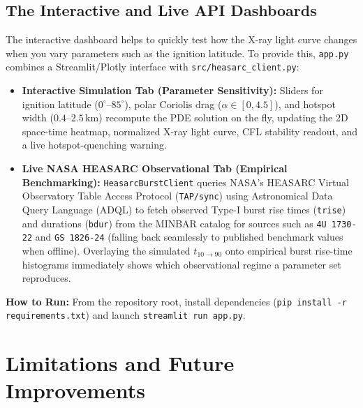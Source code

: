 \documentclass[11pt,a4paper]{article}
\begin{document}
\subsection{The Interactive and Live API Dashboards}
The interactive dashboard helps to quickly test how the X-ray light curve changes when you vary parameters such as the ignition latitude. To provide this, \texttt{app.py} combines a Streamlit/Plotly interface with \texttt{src/heasarc\_client.py}:
\begin{itemize}
    \item \textbf{Interactive Simulation Tab (Parameter Sensitivity):} Sliders for ignition latitude ($0^\circ$--$85^\circ$), polar Coriolis drag ($\alpha \in [0, 4.5]$), and hotspot width ($0.4$--$2.5\,\mathrm{km}$) recompute the PDE solution on the fly, updating the 2D space-time heatmap, normalized X-ray light curve, CFL stability readout, and a live hotspot-quenching warning.
    \item \textbf{Live NASA HEASARC Observational Tab (Empirical Benchmarking):} \texttt{HeasarcBurstClient} queries NASA's HEASARC Virtual Observatory Table Access Protocol (\texttt{TAP/sync}) \citep{HEASARC_TAP} using Astronomical Data Query Language (ADQL) to fetch observed Type-I burst rise times (\texttt{trise}) and durations (\texttt{bdur}) from the MINBAR catalog \citep{Galloway2020} for sources such as \texttt{4U~1730-22} and \texttt{GS~1826-24} (falling back seamlessly to published benchmark values when offline). Overlaying the simulated $t_{10 \to 90}$ onto empirical burst rise-time histograms immediately shows which observational regime a parameter set reproduces.
\end{itemize}
\textbf{How to Run:} From the repository root, install dependencies (\texttt{pip install -r requirements.txt}) and launch \texttt{streamlit run app.py}.

\section{Limitations and Future Improvements}
\end{document}
